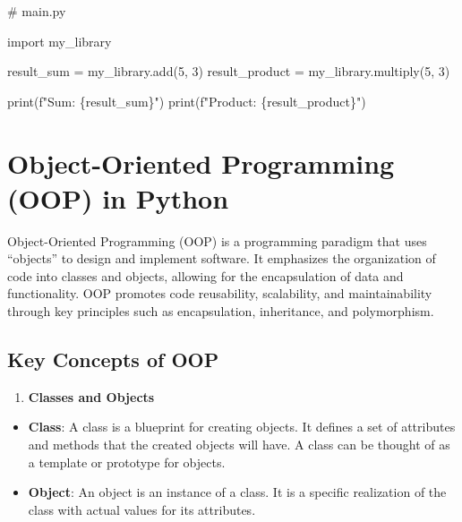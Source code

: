 \documentclass[
  letterpaper,
  DIV=11,
  numbers=noendperiod]{scrreprt}
\newenvironment{Shaded}{\begin{snugshade}}{\end{snugshade}}
\newcommand{\BuiltInTok}[1]{\textcolor[rgb]{0.00,0.23,0.31}{#1}}
\newcommand{\CommentTok}[1]{\textcolor[rgb]{0.37,0.37,0.37}{#1}}
\newcommand{\DecValTok}[1]{\textcolor[rgb]{0.68,0.00,0.00}{#1}}
\newcommand{\ImportTok}[1]{\textcolor[rgb]{0.00,0.46,0.62}{#1}}
\newcommand{\NormalTok}[1]{\textcolor[rgb]{0.00,0.23,0.31}{#1}}
\newcommand{\OperatorTok}[1]{\textcolor[rgb]{0.37,0.37,0.37}{#1}}
\newcommand{\SpecialCharTok}[1]{\textcolor[rgb]{0.37,0.37,0.37}{#1}}
\newcommand{\SpecialStringTok}[1]{\textcolor[rgb]{0.13,0.47,0.30}{#1}}
\providecommand{\tightlist}{%
  \setlength{\itemsep}{0pt}\setlength{\parskip}{0pt}}\usepackage{longtable,booktabs,array}
\theoremstyle{plain}
\theoremstyle{definition}
\theoremstyle{remark}
\begin{document}
\begin{Shaded}
\begin{Highlighting}[]
\CommentTok{\# main.py}

\ImportTok{import}\NormalTok{ my\_library}

\NormalTok{result\_sum }\OperatorTok{=}\NormalTok{ my\_library.add(}\DecValTok{5}\NormalTok{, }\DecValTok{3}\NormalTok{)}
\NormalTok{result\_product }\OperatorTok{=}\NormalTok{ my\_library.multiply(}\DecValTok{5}\NormalTok{, }\DecValTok{3}\NormalTok{)}

\BuiltInTok{print}\NormalTok{(}\SpecialStringTok{f"Sum: }\SpecialCharTok{\{}\NormalTok{result\_sum}\SpecialCharTok{\}}\SpecialStringTok{"}\NormalTok{)}
\BuiltInTok{print}\NormalTok{(}\SpecialStringTok{f"Product: }\SpecialCharTok{\{}\NormalTok{result\_product}\SpecialCharTok{\}}\SpecialStringTok{"}\NormalTok{)}
\end{Highlighting}
\end{Shaded}

\section{Object-Oriented Programming (OOP) in
Python}\label{object-oriented-programming-oop-in-python}

Object-Oriented Programming (OOP) is a programming paradigm that uses
``objects'' to design and implement software. It emphasizes the
organization of code into classes and objects, allowing for the
encapsulation of data and functionality. OOP promotes code reusability,
scalability, and maintainability through key principles such as
encapsulation, inheritance, and polymorphism.

\subsection{Key Concepts of OOP}\label{key-concepts-of-oop}

\begin{enumerate}
\def\labelenumi{\arabic{enumi}.}
\tightlist
\item
  \textbf{Classes and Objects}
\end{enumerate}

\begin{itemize}
\tightlist
\item
  \textbf{Class}: A class is a blueprint for creating objects. It
  defines a set of attributes and methods that the created objects will
  have. A class can be thought of as a template or prototype for
  objects.
\item
  \textbf{Object}: An object is an instance of a class. It is a specific
  realization of the class with actual values for its attributes.
\end{itemize}
\end{document}
